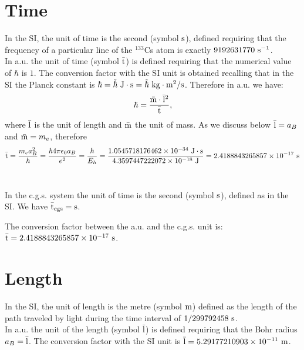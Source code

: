 \documentclass[12pt,a4paper,twoside]{report}
\def\hbarf{1.0545718176462\times 10^{-34}}
\def\barl{5.29177210903\times 10^{-11}}
\def\bart{2.4188843265857\times 10^{-17}}
\def\baru{4.3597447222072\times 10^{-18}}
\begin{document}
{\color{coral}\section{Time}}
\color{black}
In the SI, the unit of time is the second 
(symbol ${\rm s}$), defined requiring that the frequency of a particular 
line of the $^{133}$Cs atom is exactly $9192631770\ {\rm s}^{-1}$.
\\

{\color{web-blue} In a.u. the unit of time (symbol ${\rm \bar t}$) is 
defined requiring that the numerical value of $\hbar$ is $1$.
The conversion factor with the SI unit is obtained recalling that in the 
SI the Planck constant 
is $\hbar= \tilde \hbar\ {\rm J}\cdot {\rm s}=\tilde \hbar\ {\rm kg}\cdot {\rm m}^2 / 
{\rm s}$. 
Therefore in a.u. we have: 
\begin{equation}
\hbar = {{\rm \bar m} \cdot {\rm \bar l}^2 \over {\rm \bar t}},
\end{equation}
where ${\rm \bar l}$ is the unit of length and ${\rm \bar m}$ the unit of mass.
As we discuss below ${\rm \bar l}=a_B$ and ${\rm \bar m}=m_e$, therefore
\begin{equation}
{\rm \bar t} = {m_e a_B^2 \over \hbar} = 
{\hbar 4 \pi \epsilon_0 a_B \over e^2}
={\hbar \over E_h}= {\hbarf\ {\rm J}\cdot {\rm s} \over \baru\ {\rm J}}=
\bart\ {\rm s}
\end{equation}
\\
}

{\color{orange} In the c.g.s. system the unit of time 
is the second (symbol ${\rm s}$), defined as in the SI. We have ${\rm \bar t_{cgs}}={\rm s}$.
\\
}

{\color{green} The conversion factor between the a.u. and the c.g.s. unit is:
${\rm \bar t}=\bart\ {\rm s}$.
}

\newpage

{\color{coral}\section{Length}}
\color{black}
In the SI, the unit of length is the metre (symbol ${\rm m}$) defined
as the length of the path traveled by light during the time interval
of $1/299792458\ {\rm s}$.
\\

{\color{web-blue} In a.u. the unit of the length (symbol ${\rm \bar l}$) is defined
requiring that the Bohr radius $a_B= {\rm \bar l}$. The conversion factor with the
SI unit is ${\rm \bar l} = \barl\ {\rm m}$.}
\\
\end{document}
